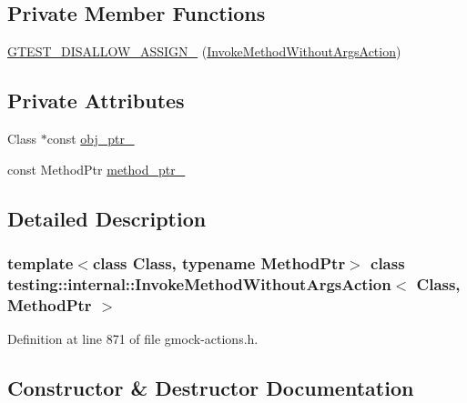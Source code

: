 \subsection*{Private Member Functions}
\begin{DoxyCompactItemize}
\item 
\hyperlink{classtesting_1_1internal_1_1InvokeMethodWithoutArgsAction_a4a2d094368220a3f68ee0648cd93372a}{G\+T\+E\+S\+T\+\_\+\+D\+I\+S\+A\+L\+L\+O\+W\+\_\+\+A\+S\+S\+I\+G\+N\+\_\+} (\hyperlink{classtesting_1_1internal_1_1InvokeMethodWithoutArgsAction}{Invoke\+Method\+Without\+Args\+Action})
\end{DoxyCompactItemize}
\subsection*{Private Attributes}
\begin{DoxyCompactItemize}
\item 
Class $\ast$const \hyperlink{classtesting_1_1internal_1_1InvokeMethodWithoutArgsAction_a43f6bbf17c63e7638e04ac5db327d6bb}{obj\+\_\+ptr\+\_\+}
\item 
const Method\+Ptr \hyperlink{classtesting_1_1internal_1_1InvokeMethodWithoutArgsAction_a3630808193580bba30b3a828ada58eca}{method\+\_\+ptr\+\_\+}
\end{DoxyCompactItemize}


\subsection{Detailed Description}
\subsubsection*{template$<$class Class, typename Method\+Ptr$>$\newline
class testing\+::internal\+::\+Invoke\+Method\+Without\+Args\+Action$<$ Class, Method\+Ptr $>$}



Definition at line 871 of file gmock-\/actions.\+h.



\subsection{Constructor \& Destructor Documentation}
\mbox{\label{classtesting_1_1internal_1_1InvokeMethodWithoutArgsAction_ac4d655e386f47a96c7a6e1670b20e991}} 
